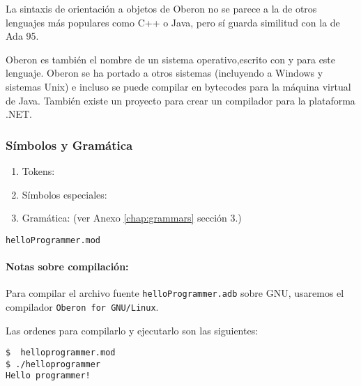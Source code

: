 La sintaxis de orientación a objetos de Oberon no se parece a la de otros lenguajes más populares como C++ o Java, pero sí guarda similitud con la de Ada 95.

Oberon es también el nombre de un sistema operativo,escrito con y para este lenguaje. Oberon se ha portado a otros sistemas (incluyendo a Windows y sistemas Unix) e incluso se puede compilar en bytecodes para la máquina virtual de Java. También existe un proyecto para crear un compilador para la plataforma .NET.

\subsubsection{Símbolos y Gramática} 

\begin{enumerate}

\item Tokens:

\item Símbolos especiales:

\item Gramática: (ver Anexo \ref{chap:grammars} sección 3.)

\end{enumerate}

\prog \texttt{helloProgrammer.mod}



\paragraph*{Notas sobre compilación:} Para compilar el archivo fuente
\texttt{helloProgrammer.adb} sobre GNU, usaremos el compilador \texttt{Oberon for GNU/Linux}. 

Las ordenes para compilarlo y ejecutarlo son las siguientes:

\begin{verbatim}
$  helloprogrammer.mod 
$ ./helloprogrammer
Hello programmer!
\end{verbatim}
